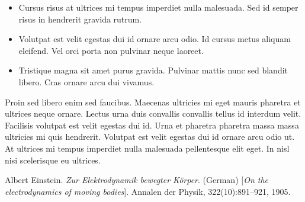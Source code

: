 \begin{PosterColumn}{0.23}

\begin{TextBox}
 \vspace*{0.9cm}
 
\sf \LARGE 

\begin{itemize}
\item Cursus risus at ultrices mi tempus imperdiet nulla malesuada. Sed id semper risus in hendrerit gravida rutrum. 
\item Volutpat est velit egestas dui id ornare arcu odio. Id cursus metus aliquam eleifend. Vel orci porta non pulvinar neque laoreet. 
\item Tristique magna sit amet purus gravida. Pulvinar mattis nunc sed blandit libero. Cras ornare arcu dui vivamus.
\end{itemize}
%
\end{TextBox}


\begin{TextBox}
 \vspace*{0.9cm}
 
 \sf \LARGE
 Proin sed libero enim sed faucibus. Maecenas ultricies mi eget mauris pharetra et ultrices neque ornare. Lectus urna duis convallis convallis tellus id interdum velit. Facilisis volutpat est velit egestas dui id. Urna et pharetra pharetra massa massa ultricies mi quis hendrerit. Volutpat est velit egestas dui id ornare arcu odio ut. At ultrices mi tempus imperdiet nulla malesuada pellentesque elit eget. In nisl nisi scelerisque eu ultrices. 
 
 \end{TextBox}
 
 \begin{TextBox}
\vspace*{0.9cm}
 
 \sf \LARGE
{

Albert Einstein. 
\textit{Zur Elektrodynamik bewegter K{\"o}rper}. (German) 
[\textit{On the electrodynamics of moving bodies}]. 
Annalen der Physik, 322(10):891–921, 1905.



}
 \end{TextBox}

\end{PosterColumn}
